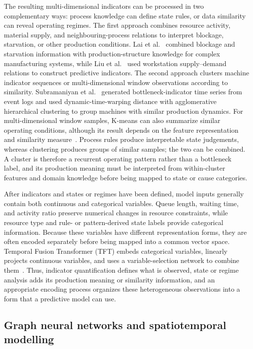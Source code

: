 \documentclass[a4paper,fleqn]{cas-dc}
\begin{document}
The resulting multi-dimensional indicators can be processed in two complementary ways: process knowledge can define state rules, or data similarity can reveal operating regimes. The first approach combines resource activity, material supply, and neighbouring-process relations to interpret blockage, starvation, or other production conditions. Lai et al.~\cite{lai2021data} combined blockage and starvation information with production-structure knowledge for complex manufacturing systems, while Liu et al.~\cite{liu2023lstmdam} used workstation supply--demand relations to construct predictive indicators. The second approach clusters machine indicator sequences or multi-dimensional window observations according to similarity. Subramaniyan et al.~\cite{subramaniyan2020clustering} generated bottleneck-indicator time series from event logs and used dynamic-time-warping distance with agglomerative hierarchical clustering to group machines with similar production dynamics. For multi-dimensional window samples, K-means can also summarize similar operating conditions, although its result depends on the feature representation and similarity measure~\cite{jain2010clustering}. Process rules produce interpretable state judgements, whereas clustering produces groups of similar samples; the two can be combined. A cluster is therefore a recurrent operating pattern rather than a bottleneck label, and its production meaning must be interpreted from within-cluster features and domain knowledge before being mapped to state or cause categories.


After indicators and states or regimes have been defined, model inputs generally contain both continuous and categorical variables. Queue length, waiting time, and activity ratio preserve numerical changes in resource constraints, while resource type and rule- or pattern-derived state labels provide categorical information. Because these variables have different representation forms, they are often encoded separately before being mapped into a common vector space. Temporal Fusion Transformer (TFT) embeds categorical variables, linearly projects continuous variables, and uses a variable-selection network to combine them~\cite{lim2021tft}. Thus, indicator quantification defines what is observed, state or regime analysis adds its production meaning or similarity information, and an appropriate encoding process organizes these heterogeneous observations into a form that a predictive model can use.


\subsection{Graph neural networks and spatiotemporal modelling}
\end{document}
